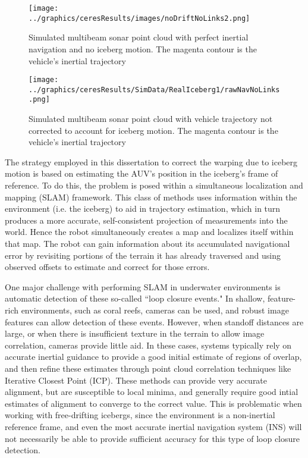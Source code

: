 \begin{figure}[!htb]
   \centering
   \texttt{[image: ../graphics/ceresResults/images/noDriftNoLinks2.png]} %
   \caption{Simulated multibeam sonar point cloud with perfect inertial navigation and no iceberg motion. The magenta contour is the vehicle's inertial trajectory}
   \label{fig:idealMap}
\end{figure}

\begin{figure}[!htb]
   \centering
   \texttt{[image: ../graphics/ceresResults/SimData/RealIceberg1/rawNavNoLinks.png]} %
   \caption{Simulated multibeam sonar point cloud with vehicle trajectory not corrected to account for iceberg motion. The magenta contour is the vehicle's inertial trajectory}
   \label{fig:Challenge}
\end{figure}

The strategy employed in this dissertation to correct the warping due to iceberg motion is based on estimating the AUV's position in the iceberg's frame of reference. To do this, the problem is posed within a simultaneous localization and mapping (SLAM) framework. This class of methods uses information within the environment (i.e. the iceberg) to aid in trajectory estimation, which in turn produces a more accurate, self-consistent projection of measurements into the world. Hence the robot simultaneously creates a map and localizes itself within that map. The robot can gain information about its accumulated navigational error by revisiting portions of the terrain it has already traversed and using observed offsets to estimate and correct for those errors. 

One major challenge with performing SLAM in underwater environments is automatic detection of these so-called ``loop closure events." In shallow, feature-rich environments, such as coral reefs, cameras can be used, and robust image features can allow detection of these events. However, when standoff distances are large, or when there is insufficient texture in the terrain to allow image correlation, cameras provide little aid. In these cases, systems typically rely on accurate inertial guidance to provide a good initial estimate of regions of overlap, and then refine these estimates through point cloud correlation techniques like Iterative Closest Point (ICP). These methods can provide very accurate alignment, but are susceptible to local minima, and generally require good intial estimates of alignment to converge to the correct value. This is problematic when working with free-drifting icebergs, since the environment is a non-inertial reference frame, and even the most accurate inertial navigation system (INS) will not necessarily be able to provide sufficient accuracy for this type of loop closure detection. 





